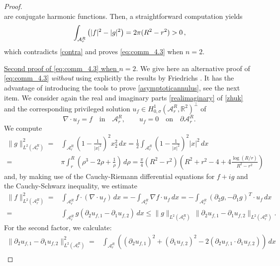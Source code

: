 \documentclass[11pt]{article}
\theoremstyle{plain}
\theoremstyle{definition}
\numberwithin{equation}{section}
\newcommand{\R}{\mathbb{R}}
\begin{document}
\begin{proof}
\begin{equation}
\end{equation}
are conjugate harmonic functions. Then, a straightforward computation yields
\begin{equation}\label{eq:comm_2.1}\\
\int_{\mathcal{A}_r^R} \left( |f|^2 - |g|^2 \right) = 2 \pi (R^2 - r^2) > 0 \, ,
\end{equation}
which contradicts \eqref{contra} and proves \eqref{eq:comm_4.3} when $n=2$.\par
\underline{Second proof of \eqref{eq:comm_4.3} when $n=2$}. We give here an alternative proof of \eqref{eq:comm_4.3} {\em without}
using explicitly the results by Friedrichs \cite{friedrichs1937certain}. It has the advantage of introducing the tools to prove \eqref{asymptoticannulus},
see the next item. We consider again the real and imaginary parts \eqref{realimaginary} of \eqref{zhuk}
and the corresponding privileged solution $u_f \in H^1_{0,\sigma}(\mathcal{A}_r^R,\R^2)^\perp$ of
$$
\nabla \cdot u_f=f \quad \mbox{in}\quad \mathcal{A}_r^R, \qquad u_f=0
 \quad \mbox{on}\quad \partial \mathcal{A}_r^R.
$$
We compute
\begin{align}
\| g\|^2_{L^2(\mathcal{A}_r^R)}=&\int_{\mathcal{A}_r^R} \left(1-\frac{1}{|x|^2} \right)^2x_2^2\, dx
=\frac{1}{2}\int_{\mathcal{A}_r^R} \left(1-\frac{1}{|x|^2} \right)^2|x|^2\, dx\nonumber \\
=&\pi \int^R_r \left(\rho^3-2\rho+\frac{1}{\rho}\right)\, d\rho
=\frac{\pi}{4}(R^2-r^2)\left( R^2+r^2-4+4\frac{\log (R/r)}{R^2-r^2}\right)\label{eq:comm_2.2}
\end{align}
and, by making use of the Cauchy-Riemann differential equations for $f+ig$ and the Cauchy-Schwarz inequality, we estimate
\begin{align*}
\| f\|^2_{L^2(\mathcal{A}_r^R)}=& \int_{\mathcal{A}_r^R} f \cdot (\nabla \cdot u_f)\, dx
=-\int_{\mathcal{A}_r^R} \nabla f \cdot   u_f\, dx
=-\int_{\mathcal{A}_r^R} (\partial_2 g, -\partial_1 g)^T \cdot   u_f\, dx\\
=&\int_{\mathcal{A}_r^R} g(\partial_2 u_{f,1} -\partial_1 u_{f,2}) \, dx
\le \| g\|_{L^2(\mathcal{A}_r^R)} \, \| \partial_2 u_{f,1} -\partial_1 u_{f,2} \|_{L^2(\mathcal{A}_r^R)}.
\end{align*}
For the second factor, we calculate:
\begin{align*}
\| \partial_2 u_{f,1} -\partial_1 u_{f,2} \|^2_{L^2(\mathcal{A}_r^R)} =&
\int_{\mathcal{A}_r^R} \left( (\partial_2 u_{f,1})^2+(\partial_1 u_{f,2})^2-2(\partial_2 u_{f,1}\cdot \partial_1 u_{f,2})\right)\, dx\\

\end{align*}
\end{proof}
\end{document}
